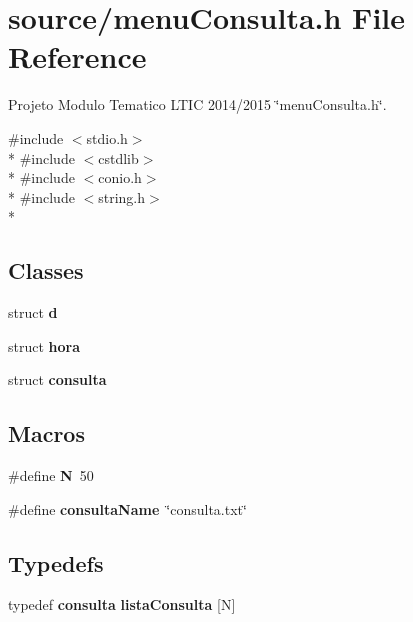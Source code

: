 \section{source/menu\+Consulta.h File Reference}
\label{menu_consulta_8h}


Projeto Modulo Tematico L\+T\+I\+C 2014/2015 \char`\"{}menu\+Consulta.\+h\char`\"{}.  


{\ttfamily \#include $<$stdio.\+h$>$}\\*
{\ttfamily \#include $<$cstdlib$>$}\\*
{\ttfamily \#include $<$conio.\+h$>$}\\*
{\ttfamily \#include $<$string.\+h$>$}\\*
\subsection*{Classes}
\begin{DoxyCompactItemize}
\item 
struct {\bf d}
\item 
struct {\bf hora}
\item 
struct {\bf consulta}
\end{DoxyCompactItemize}
\subsection*{Macros}
\begin{DoxyCompactItemize}
\item 
\#define {\bfseries N}~50\label{menu_consulta_8h_a0240ac851181b84ac374872dc5434ee4}

\item 
\#define {\bfseries consulta\+Name}~\char`\"{}consulta.\+txt\char`\"{}\label{menu_consulta_8h_a33857323888f5040edefcf6af45b9844}

\end{DoxyCompactItemize}
\subsection*{Typedefs}
\begin{DoxyCompactItemize}
\item 
typedef {\bf consulta} {\bf lista\+Consulta} [N]
\end{DoxyCompactItemize}
